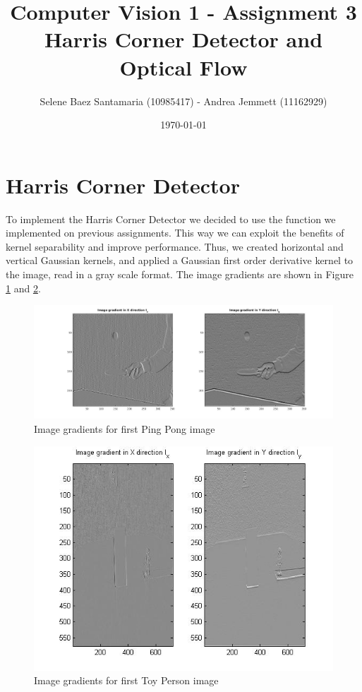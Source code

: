 \documentclass[11pt]{article}
\title{
	{Computer Vision 1 - Assignment 3 \\
	Harris Corner Detector and Optical Flow}
}
\author{
Selene Baez Santamaria (10985417) - Andrea Jemmett (11162929)}
\date{\today}
\begin{document}
\maketitle

\section{Harris Corner Detector}
To implement the Harris Corner Detector we decided to use the function we
implemented on previous assignments. This way we can exploit the benefits of
kernel separability and improve performance. Thus, we created horizontal and
vertical Gaussian kernels, and applied a Gaussian first order derivative kernel to
the image, read in a gray scale format. The image gradients are shown in Figure
\ref{fig:partialDerivatives_pingpong} and \ref{fig:partialDerivatives_person}.

\begin{figure}[H] \centering
	\includegraphics[width=1\textwidth]{imgs/derivatives_pingpong.jpg}
	\caption{Image gradients for first Ping Pong image}
	\label{fig:partialDerivatives_pingpong}
\end{figure}

\begin{figure}[H] \centering
	\includegraphics[width=1\textwidth]{imgs/derivatives_person.jpg}
	\caption{Image gradients for first Toy Person image}
	\label{fig:partialDerivatives_person}
\end{figure}
\end{document}
